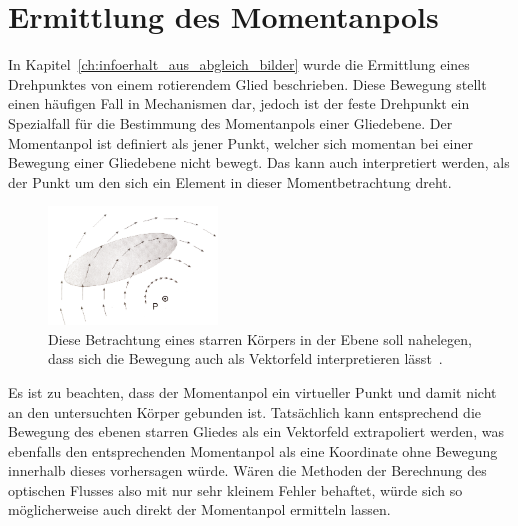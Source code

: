 
\chapter{Ermittlung des Momentanpols}\label{ch:ermittlung_momentanpol}


In Kapitel~\ref{ch:infoerhalt_aus_abgleich_bilder} wurde die Ermittlung eines Drehpunktes von einem rotierendem Glied beschrieben.
Diese Bewegung stellt einen häufigen Fall in Mechanismen dar, jedoch ist der feste Drehpunkt ein Spezialfall für die Bestimmung des Momentanpols einer Gliedebene.
Der Momentanpol ist definiert als jener Punkt, welcher sich momentan bei einer Bewegung einer Gliedebene nicht bewegt.
Das kann auch interpretiert werden, als der Punkt um den sich ein Element in dieser Momentbetrachtung dreht.

\begin{figure}
    \centering
    \includegraphics[width=0.4\textwidth]{gfx/mechanismentechnik_vektorfeld_momentanpol.png}
    \caption[Vektorfeld der ebenen Bewegung]{Diese Betrachtung eines starren Körpers in der Ebene soll nahelegen, dass sich die Bewegung auch als Vektorfeld interpretieren lässt~\cite{Goessner2016}.}\label{fig:mechanismentechnik_vektorfeld_momentanpol}
\end{figure}

Es ist zu beachten, dass der Momentanpol ein virtueller Punkt und damit nicht an den untersuchten Körper gebunden ist.
Tatsächlich kann entsprechend die Bewegung des ebenen starren Gliedes als ein Vektorfeld extrapoliert werden, was ebenfalls den entsprechenden Momentanpol als eine Koordinate ohne Bewegung innerhalb dieses vorhersagen würde.
Wären die Methoden der Berechnung des optischen Flusses also mit nur sehr kleinem Fehler behaftet, würde sich so möglicherweise auch direkt der Momentanpol ermitteln lassen.

